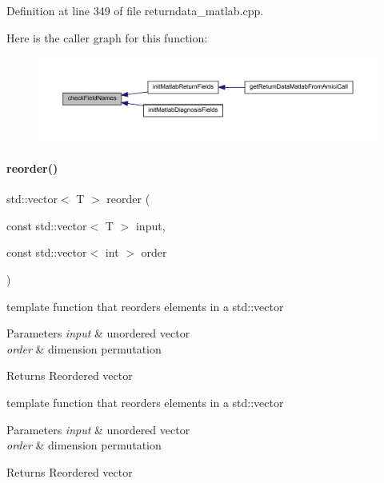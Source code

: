 Definition at line 349 of file returndata\+\_\+matlab.\+cpp.

Here is the caller graph for this function\+:
\nopagebreak
\begin{figure}[H]
\begin{center}
\leavevmode
\includegraphics[width=350pt]{namespaceamici_ad34a0a8f0a3d44e86371a2ecb5841c09_icgraph}
\end{center}
\end{figure}
\mbox{\label{namespaceamici_ac6d55e052cd87c2cbd7a5a26e8d11628}} 
\paragraph{\texorpdfstring{reorder()}{reorder()}}
{\footnotesize\ttfamily std\+::vector$<$ T $>$ reorder (\begin{DoxyParamCaption}\item[{const std\+::vector$<$ T $>$}]{input,  }\item[{const std\+::vector$<$ int $>$}]{order }\end{DoxyParamCaption})}

template function that reorders elements in a std\+::vector


\begin{DoxyParams}{Parameters}
{\em input} & unordered vector \\
\hline
{\em order} & dimension permutation\\
\hline
\end{DoxyParams}
\begin{DoxyReturn}{Returns}
Reordered vector
\end{DoxyReturn}
template function that reorders elements in a std\+::vector


\begin{DoxyParams}{Parameters}
{\em input} & unordered vector \\
\hline
{\em order} & dimension permutation\\
\hline
\end{DoxyParams}
\begin{DoxyReturn}{Returns}
Reordered vector
\end{DoxyReturn}


